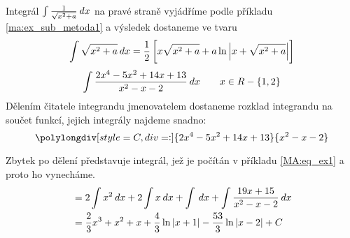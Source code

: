 \begin{mdframed}[style=mdexam]
\begin{example}
    Integrál \(\int\frac{1}{\sqrt{x^2+a}}\hspace{2pt}dx\) na pravé straně vyjádříme podle příkladu 
    \ref{ma:ex_sub_metoda1} a výsledek do\-sta\-ne\-me ve tvaru
    \begin{equation*}
      \int\displaystyle{{\sqrt{x^2+a}\hspace{2pt}dx}
          =\frac{1}{2}\left[x\sqrt{x^2+a}+a\ln{\left\lvert x + \sqrt{x^2+a}\right\rvert}\right]}
    \end{equation*}
    \begin{equation}\label{mai:int_ex_02}
      \int{\frac{2x^4-5x^2+14x+13}{x^2-x-2}\hspace{2pt}dx} \qquad x\in R - \{1,2\}
    \end{equation}
    Dělením čitatele integrandu jmenovatelem dostaneme rozklad integrandu na součet funkcí, jejich 
    integrály najdeme snadno:
    \begin{equation*}
      \polylongdiv[style=C,div=:]{2x^4-5x^2+14x+13}{x^2-x-2}
    \end{equation*}

    Zbytek po dělení představuje integrál, jež je počítán v příkladu \ref{MA:eq_ex1} a proto ho 
    vynecháme. 
    \begin{align*}
       &= 2\int x^2\hspace{2pt}dx + 2\int x\hspace{2pt}dx + \int\hspace{2pt}dx + \int\frac{19x+15}{x^2-x-2}\hspace{2pt}dx     \\
       &= \frac{2}{3}x^3 + x^2 + x + \frac{4}{3}\ln\left\lvert x+1\right\rvert - \frac{53}{3}\ln\left\lvert x-2\right\rvert + C 
    \end{align*}
  \end{example}
\end{mdframed}